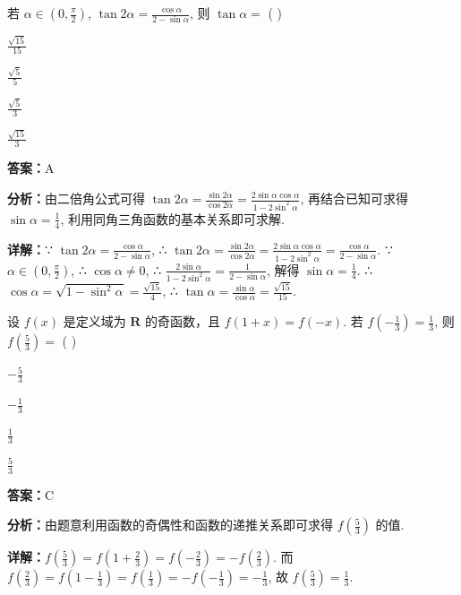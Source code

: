 \begin{question}[points=5]
若 $\alpha \in \left(0, \frac{\pi}{2}\right)$, $\tan 2\alpha = \frac{\cos \alpha}{2 - \sin \alpha}$, 则 $\tan \alpha =$ ( )
\begin{choices}
  \item $\frac{\sqrt{15}}{15}$
  \item $\frac{\sqrt{5}}{5}$
  \item $\frac{\sqrt{5}}{3}$
  \item $\frac{\sqrt{15}}{3}$
\end{choices}
\begin{solution}
\textbf{答案：}A

\textbf{分析：}由二倍角公式可得 $\tan 2\alpha = \frac{\sin 2\alpha}{\cos 2\alpha} = \frac{2\sin\alpha\cos\alpha}{1-2\sin^2\alpha}$, 再结合已知可求得 $\sin\alpha = \frac{1}{4}$, 利用同角三角函数的基本关系即可求解.

\textbf{详解：}∵ $\tan 2\alpha = \frac{\cos\alpha}{2-\sin\alpha}$, ∴ $\tan 2\alpha = \frac{\sin 2\alpha}{\cos 2\alpha} = \frac{2\sin\alpha\cos\alpha}{1-2\sin^2\alpha} = \frac{\cos\alpha}{2-\sin\alpha}$. ∵ $\alpha \in \left(0, \frac{\pi}{2}\right)$, ∴ $\cos\alpha \neq 0$, ∴ $\frac{2\sin\alpha}{1-2\sin^2\alpha} = \frac{1}{2-\sin\alpha}$, 解得 $\sin\alpha = \frac{1}{4}$. ∴ $\cos\alpha = \sqrt{1-\sin^2\alpha} = \frac{\sqrt{15}}{4}$, ∴ $\tan\alpha = \frac{\sin\alpha}{\cos\alpha} = \frac{\sqrt{15}}{15}$.
\end{solution}
\end{question}

\begin{question}[points=5]
设 $f(x)$ 是定义域为 $\mathbf{R}$ 的奇函数，且 $f(1+x)=f(-x)$. 若 $f\left(-\frac{1}{3}\right) = \frac{1}{3}$, 则 $f\left(\frac{5}{3}\right) =$ ( )
\begin{choices}
  \item $-\frac{5}{3}$
  \item $-\frac{1}{3}$
  \item $\frac{1}{3}$
  \item $\frac{5}{3}$
\end{choices}
\begin{solution}
\textbf{答案：}C

\textbf{分析：}由题意利用函数的奇偶性和函数的递推关系即可求得 $f\left(\frac{5}{3}\right)$ 的值.

\textbf{详解：}$f\left(\frac{5}{3}\right) = f\left(1+\frac{2}{3}\right) = f\left(-\frac{2}{3}\right) = -f\left(\frac{2}{3}\right)$. 而 $f\left(\frac{2}{3}\right) = f\left(1-\frac{1}{3}\right) = f\left(\frac{1}{3}\right) = -f\left(-\frac{1}{3}\right) = -\frac{1}{3}$, 故 $f\left(\frac{5}{3}\right) = \frac{1}{3}$.
\end{solution}
\end{question}

